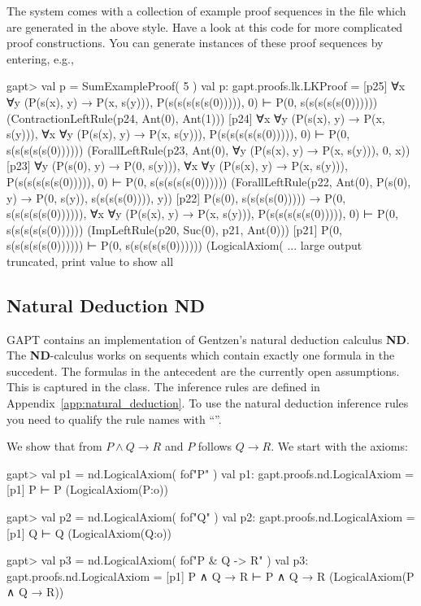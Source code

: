 \documentclass[a4paper,11pt]{book}
\newcommand{\impl}{\to} %
\renewcommand{\land}{\wedge}
\newcommand{\ND}{\textbf{ND}}
\newcommand{\cli}[1]{{\ttfamily {#1}}}
\begin{document}
The system comes with a collection of example proof sequences in the file
\cli{examples/ProofSequences.scala} which are generated in the above style.
Have a look at this code for more complicated proof constructions.
You can generate instances of these proof sequences by entering, e.g.,
\begin{clilisting}
gapt> val p = SumExampleProof( 5 )
val p: gapt.proofs.lk.LKProof = [p25] ∀x ∀y (P(s(x), y) → P(x, s(y))), P(s(s(s(s(s(0))))), 0) ⊢ P(0, s(s(s(s(s(0))))))    (ContractionLeftRule(p24, Ant(0), Ant(1)))
[p24] ∀x ∀y (P(s(x), y) → P(x, s(y))),
∀x ∀y (P(s(x), y) → P(x, s(y))),
P(s(s(s(s(s(0))))), 0)
⊢
P(0, s(s(s(s(s(0))))))    (ForallLeftRule(p23, Ant(0), ∀y (P(s(x), y) → P(x, s(y))), 0, x))
[p23] ∀y (P(s(0), y) → P(0, s(y))),
∀x ∀y (P(s(x), y) → P(x, s(y))),
P(s(s(s(s(s(0))))), 0)
⊢
P(0, s(s(s(s(s(0))))))    (ForallLeftRule(p22, Ant(0), P(s(0), y) → P(0, s(y)), s(s(s(s(0)))), y))
[p22] P(s(0), s(s(s(s(0))))) → P(0, s(s(s(s(s(0)))))),
∀x ∀y (P(s(x), y) → P(x, s(y))),
P(s(s(s(s(s(0))))), 0)
⊢
P(0, s(s(s(s(s(0))))))    (ImpLeftRule(p20, Suc(0), p21, Ant(0)))
[p21] P(0, s(s(s(s(s(0)))))) ⊢ P(0, s(s(s(s(s(0))))))    (LogicalAxiom( ... large output truncated, print value to show all

\end{clilisting}

\subsection{Natural Deduction ND}

GAPT contains an implementation of Gentzen's natural deduction calculus {\ND}.
The {\ND}-calculus works on sequents which contain exactly one formula in the succedent.
The formulas in the antecedent are the currently open assumptions. This is captured
in the \cli{NDSequent} class. The inference rules are defined in Appendix~\ref{app:natural_deduction}.
To use the natural deduction inference rules you need to qualify the rule names with ``\cli{nd.}''.

We show that from $P \land Q \impl R$ and $P$ follows $Q \impl R$. We start with
the axioms:

\begin{clilisting}
gapt> val p1 = nd.LogicalAxiom( fof"P" )
val p1: gapt.proofs.nd.LogicalAxiom = [p1] P ⊢ P    (LogicalAxiom(P:o))

gapt> val p2 = nd.LogicalAxiom( fof"Q" )
val p2: gapt.proofs.nd.LogicalAxiom = [p1] Q ⊢ Q    (LogicalAxiom(Q:o))

gapt> val p3 = nd.LogicalAxiom( fof"P & Q -> R" )
val p3: gapt.proofs.nd.LogicalAxiom = [p1] P ∧ Q → R ⊢ P ∧ Q → R    (LogicalAxiom(P ∧ Q → R))

\end{clilisting}
\end{document}
